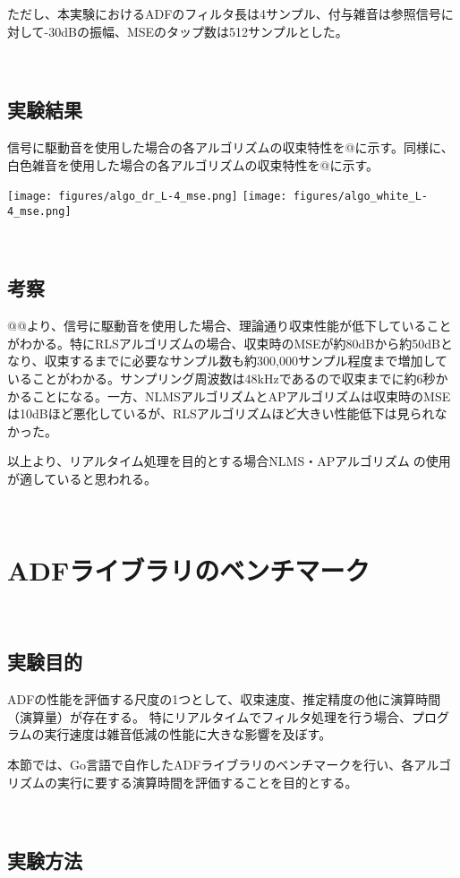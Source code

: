 ただし、本実験におけるADFのフィルタ長は4サンプル、付与雑音は参照信号に対して-30dBの振幅、MSEのタップ数は512サンプルとした。

\
\subsection{実験結果}\label{result-color}

信号に駆動音を使用した場合の各アルゴリズムの収束特性を@に示す。同様に、白色雑音を使用した場合の各アルゴリズムの収束特性を@に示す。

\texttt{[image: figures/algo\_dr\_L-4\_mse.png]}
\texttt{[image: figures/algo\_white\_L-4\_mse.png]}

\
\subsection{考察}\label{consideration-color}

@@より、信号に駆動音を使用した場合、理論通り収束性能が低下していることがわかる。特にRLSアルゴリズムの場合、収束時のMSEが約80dBから約50dBとなり、収束するまでに必要なサンプル数も約300,000サンプル程度まで増加していることがわかる。サンプリング周波数は48kHzであるので収束までに約6秒かかることになる。一方、NLMSアルゴリズムとAPアルゴリズムは収束時のMSEは10dBほど悪化しているが、RLSアルゴリズムほど大きい性能低下は見られなかった。

以上より、リアルタイム処理を目的とする場合NLMS・APアルゴリズムの使用が適していると思われる。

\
\section{ADFライブラリのベンチマーク}\label{benchmark}

\
\subsection{実験目的}\label{purpose-benchmark}

ADFの性能を評価する尺度の1つとして、収束速度、推定精度の他に演算時間（演算量）が存在する。
特にリアルタイムでフィルタ処理を行う場合、プログラムの実行速度は雑音低減の性能に大きな影響を及ぼす。

本節では、Go言語で自作したADFライブラリのベンチマークを行い、各アルゴリズムの実行に要する演算時間を評価することを目的とする。

\
\subsection{実験方法}\label{instruction-benchmark}

